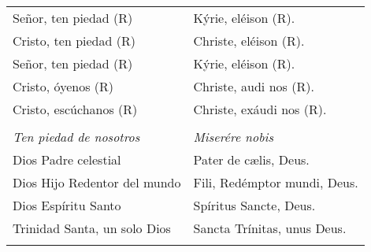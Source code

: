 \documentclass[./rosary.tex]{subfiles}
\begin{document}
\begin{longtable} { p{} p{} }
    Señor, ten piedad (R) & Kýrie, eléison (R).\\
    Cristo, ten piedad (R) & Christe, eléison (R).\\
    Señor, ten piedad (R) & Kýrie, eléison (R).\\
    Cristo, óyenos (R) & Christe, audi nos (R).\\
    Cristo, escúchanos (R) & Christe, exáudi nos (R).\\\\

    \emph{Ten piedad de nosotros} & \emph{Miserére nobis}\\
    Dios Padre celestial & Pater de cælis, Deus.\\
    Dios Hijo Redentor del mundo & Fili, Redémptor mundi, Deus.\\
    Dios Espíritu Santo & Spíritus Sancte, Deus.\\
    Trinidad Santa, un solo Dios & Sancta Trínitas, unus Deus.\\\\


\end{longtable}
\end{document}
